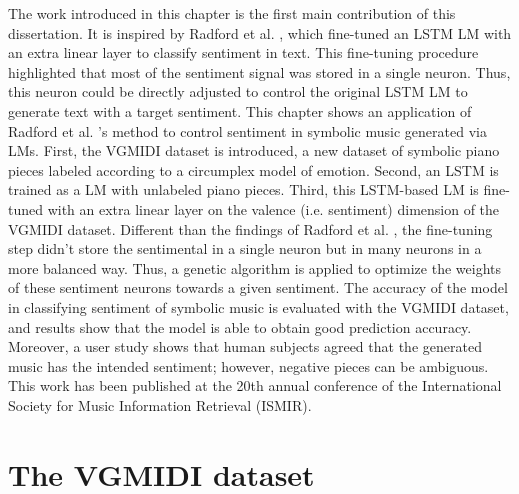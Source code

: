 The work introduced in this chapter is the first main contribution of this dissertation. It is inspired by Radford et al. \cite{radford_2017}, which fine-tuned an LSTM LM with an extra linear layer to classify sentiment in text. This fine-tuning procedure highlighted that most of the sentiment signal was stored in a single neuron. Thus, this neuron could be directly adjusted to control the original LSTM LM to generate text with a target sentiment. This chapter shows an application of Radford et al. \cite{radford_2017}'s method to control sentiment in symbolic music generated via LMs. First, the VGMIDI dataset is introduced, a new dataset of symbolic piano pieces labeled according to a circumplex model of emotion. Second, an LSTM is trained as a LM with unlabeled piano pieces. Third, this LSTM-based LM is fine-tuned with an extra linear layer on the valence (i.e. sentiment) dimension of the VGMIDI dataset. Different than the findings of Radford et al. \cite{radford_2017}, the fine-tuning step didn't store the sentimental in a single neuron but in many neurons in a more balanced way. Thus, a genetic algorithm is applied to optimize the weights of these sentiment neurons towards a given sentiment. The accuracy of the model in classifying sentiment of symbolic music is evaluated with the VGMIDI dataset, and results show that the model is able to obtain good prediction accuracy. Moreover, a user study shows that human subjects agreed that the generated music has the intended sentiment; however, negative pieces can be ambiguous. This work has been published at the 20th annual conference of the International Society for Music Information Retrieval (ISMIR).

\section{The VGMIDI dataset}

